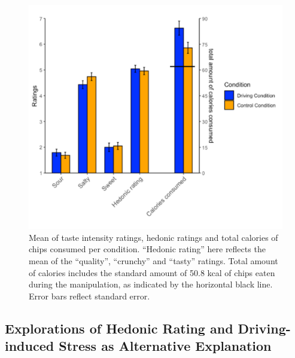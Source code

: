 \documentclass[authordate, empirical]{jote-new-article}
\begin{document}
\begin{figure}[t!]
  \begin{fullwidth}
    \includegraphics[width=\linewidth]{media/image2.png}
    \caption{Mean of taste intensity ratings, hedonic ratings and total calories of chips consumed per condition. “Hedonic rating” here reflects the mean of the “quality”, “crunchy” and “tasty” ratings. Total amount of calories includes the standard amount of 50.8 kcal of chips eaten during the manipulation, as indicated by the horizontal black line. Error bars reflect standard error.}
  \end{fullwidth}
  \label{fig:rId14}

\end{figure}









\subsection{Explorations of Hedonic Rating and Driving-induced Stress as Alternative Explanation }

\vspace*{-1\baselineskip}
\end{document}
